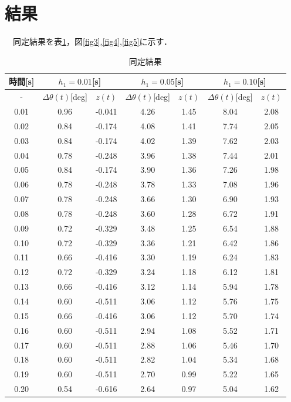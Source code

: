 \documentclass[11pt,a4paper]{jsarticle}
\begin{document}
\section{結果}
　同定結果を表\ref{tab1}，図\ref{fig3},\ref{fig4},\ref{fig5}に示す．
\begin{table}[hb]
 \begin{center}
  \caption{同定結果}
  \begin{tabular}[b]{|c||c|c|c|c|c|c|} \hline
   \multicolumn{1}{|c||}{時間[s]}
   & \multicolumn{2}{c|}{$h_1 = 0.01$[s]} 
   & \multicolumn{2}{c|}{$h_1 = 0.05$[s]}
   & \multicolumn{2}{c|}{$h_1 = 0.10$[s]} \\ \hline
   -  & $\Delta \theta(t)$[deg] & $z(t)$ & $\Delta \theta(t)$[deg] & $z(t)$ & $\Delta \theta(t)$[deg] & $z(t)$ \\ \hline \hline 
   0.01 & 0.96 & -0.041 & 4.26 & 1.45 & 8.04 & 2.08 \\ \hline
   0.02 & 0.84 & -0.174 & 4.08 & 1.41 & 7.74 & 2.05 \\ \hline
   0.03 & 0.84 & -0.174 & 4.02 & 1.39 & 7.62 & 2.03 \\ \hline
   0.04 & 0.78 & -0.248 & 3.96 & 1.38 & 7.44 & 2.01 \\ \hline
   0.05 & 0.84 & -0.174 & 3.90 & 1.36 & 7.26 & 1.98 \\ \hline
   0.06 & 0.78 & -0.248 & 3.78 & 1.33 & 7.08 & 1.96 \\ \hline
   0.07 & 0.78 & -0.248 & 3.66 & 1.30 & 6.90 & 1.93 \\ \hline
   0.08 & 0.78 & -0.248 & 3.60 & 1.28 & 6.72 & 1.91 \\ \hline
   0.09 & 0.72 & -0.329 & 3.48 & 1.25 & 6.54 & 1.88 \\ \hline
   0.10 & 0.72 & -0.329 & 3.36 & 1.21 & 6.42 & 1.86 \\ \hline
   0.11 & 0.66 & -0.416 & 3.30 & 1.19 & 6.24 & 1.83 \\ \hline
   0.12 & 0.72 & -0.329 & 3.24 & 1.18 & 6.12 & 1.81 \\ \hline
   0.13 & 0.66 & -0.416 & 3.12 & 1.14 & 5.94 & 1.78 \\ \hline
   0.14 & 0.60 & -0.511 & 3.06 & 1.12 & 5.76 & 1.75 \\ \hline
   0.15 & 0.66 & -0.416 & 3.06 & 1.12 & 5.70 & 1.74 \\ \hline
   0.16 & 0.60 & -0.511 & 2.94 & 1.08 & 5.52 & 1.71 \\ \hline
   0.17 & 0.60 & -0.511 & 2.88 & 1.06 & 5.46 & 1.70 \\ \hline
   0.18 & 0.60 & -0.511 & 2.82 & 1.04 & 5.34 & 1.68 \\ \hline
   0.19 & 0.60 & -0.511 & 2.70 & 0.99 & 5.22 & 1.65 \\ \hline
   0.20 & 0.54 & -0.616 & 2.64 & 0.97 & 5.04 & 1.62 \\ \hline
  \end{tabular}
 \label{tab1}
 \end{center}
\end{table}
\end{document}
